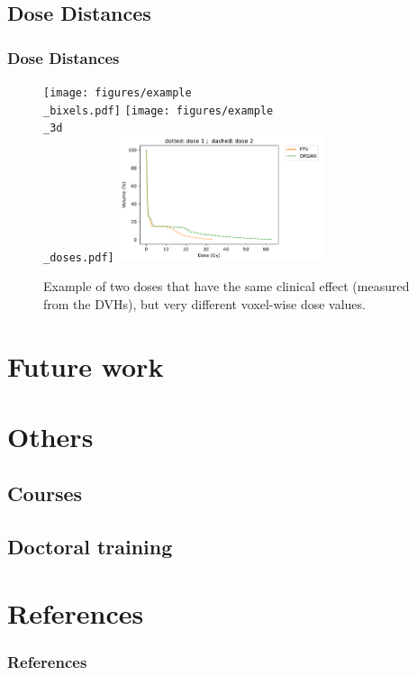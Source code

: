 \documentclass{beamer}
\begin{document}
	\subsection{Dose Distances}
	\begin{frame}
		\frametitle{Dose Distances}
		\begin{figure}
			\vspace{-0.5cm}
			\texttt{[image: figures/example\\\_bixels.pdf]}
			\texttt{[image: figures/example\\\_3d\\\_doses.pdf]}
			\vspace{-0.3cm}
			\includegraphics[width=6cm]{figures/example_dvh.pdf}
			\caption{Example of two doses that have the same clinical effect (measured from the DVHs), but very different voxel-wise dose values.}
		\end{figure}
	\end{frame}
	
	\section{Future work}
	
	\section{Others}
	\subsection{Courses}
	\subsection{Doctoral training}
	\section{References}
	\begin{frame}
		\frametitle{References}
		
	\end{frame}
	

	

	
	
	
	
	
	
	
	
\end{document}
